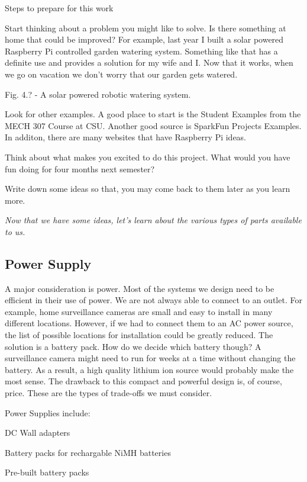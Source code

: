 \documentclass[
]{book}
\begin{document}
Steps to prepare for this work

Start thinking about a problem you might like to solve. Is there something at home that could be improved? For example, last year I built a solar powered Raspberry Pi controlled garden watering system. Something like that has a definite use and provides a solution for my wife and I. Now that it works, when we go on vacation we don't worry that our garden gets watered.

Fig. 4.? - A solar powered robotic watering system.

Look for other examples. A good place to start is the Student Examples from the MECH 307 Course at CSU. Another good source is SparkFun Projects Examples. In additon, there are many websites that have Raspberry Pi ideas.

Think about what makes you excited to do this project. What would you have fun doing for four months next semester?

Write down some ideas so that, you may come back to them later as you learn more.

\emph{Now that we have some ideas, let's learn about the various types of parts available to us.}

\hypertarget{power-supply}{%
\subsection{Power Supply}\label{power-supply}}

A major consideration is power. Most of the systems we design need to be efficient in their use of power. We are not always able to connect to an outlet. For example, home surveillance cameras are small and easy to install in many different locations. However, if we had to connect them to an AC power source, the list of possible locations for installation could be greatly reduced. The solution is a battery pack. How do we decide which battery though? A surveillance camera might need to run for weeks at a time without changing the battery. As a result, a high quality lithium ion source would probably make the most sense. The drawback to this compact and powerful design is, of course, price. These are the types of trade-offs we must consider.

Power Supplies include:

DC Wall adapters

Battery packs for rechargable NiMH batteries

Pre-built battery packs
\end{document}
